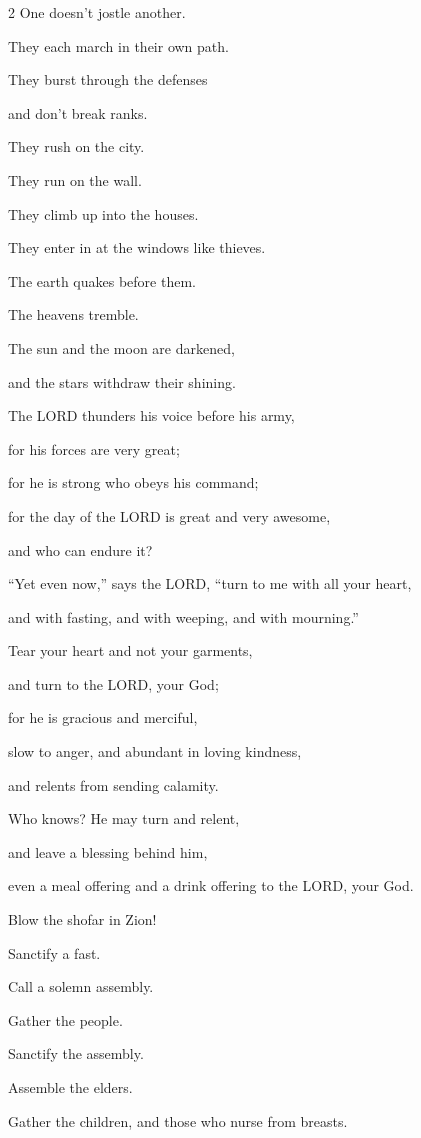 \begin{multicols}{2}
\myverse{}One doesn’t jostle another.

They each march in their own path.

They burst through the defenses

and don’t break ranks.

\myverse{}They rush on the city.

They run on the wall.

They climb up into the houses.

They enter in at the windows like thieves.

\myverse{}The earth quakes before them.

The heavens tremble.

The sun and the moon are darkened,

and the stars withdraw their shining.

\myverse{}The LORD thunders his voice before his army,

for his forces are very great;

for he is strong who obeys his command;

for the day of the LORD is great and very awesome,

and who can endure it?

\myverse{}“Yet even now,” says the LORD, “turn to me with all your heart,

and with fasting, and with weeping, and with mourning.”

\myverse{}Tear your heart and not your garments,

and turn to the LORD, your God;

for he is gracious and merciful,

slow to anger, and abundant in loving kindness,

and relents from sending calamity.

\myverse{}Who knows? He may turn and relent,

and leave a blessing behind him,

even a meal offering and a drink offering to the LORD, your God.

\myverse{}Blow the shofar in Zion!

Sanctify a fast.

Call a solemn assembly.

\myverse{}Gather the people.

Sanctify the assembly.

Assemble the elders.

Gather the children, and those who nurse from breasts.


\end{multicols}
